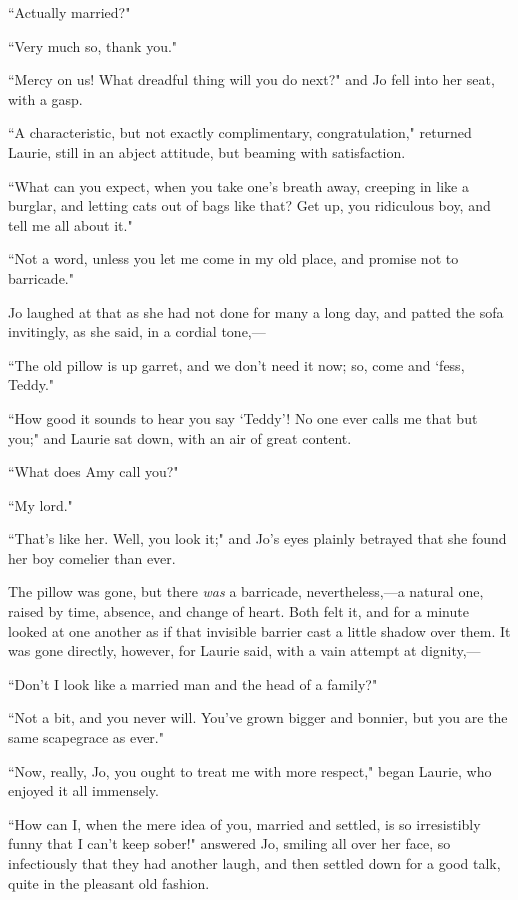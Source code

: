 ``Actually married?"

``Very much so, thank you."

``Mercy on us! What dreadful thing will you do next?" and Jo fell into
her seat, with a gasp.

``A characteristic, but not exactly complimentary, congratulation,"
returned Laurie, still in an abject attitude, but beaming with
satisfaction.

``What can you expect, when you take one's breath away,
creeping in like a burglar, and letting cats out of bags like that? Get
up, you ridiculous boy, and tell me all about it."

``Not a word, unless you let me come in my old place, and promise not to
barricade."

Jo laughed at that as she had not done for many a long day, and patted
the sofa invitingly, as she said, in a cordial tone,---

``The old pillow is up garret, and we don't need it now;
so, come and `fess, Teddy."

``How good it sounds to hear you say
`Teddy'! No one ever calls me that but
you;" and Laurie sat down, with an air of great content.

``What does Amy call you?"

``My lord."

``That's like her. Well, you look it;" and
Jo's eyes plainly betrayed that she found her boy
comelier than ever.

The pillow was gone, but there \emph{was} a barricade, nevertheless,---a
natural one, raised by time, absence, and change of heart. Both felt it,
and for a minute looked at one another as if that invisible barrier cast
a little shadow over them. It was gone directly, however, for Laurie
said, with a vain attempt at dignity,---

``Don't I look like a married man and the head of a
family?"

``Not a bit, and you never will. You've grown bigger and
bonnier, but you are the same scapegrace as ever."

``Now, really, Jo, you ought to treat me with more respect," began
Laurie, who enjoyed it all immensely.

``How can I, when the mere idea of you, married and settled, is so
irresistibly funny that I can't keep sober!" answered
Jo, smiling all over her face, so infectiously that they had another
laugh, and then settled down for a good talk, quite in the pleasant old
fashion.

